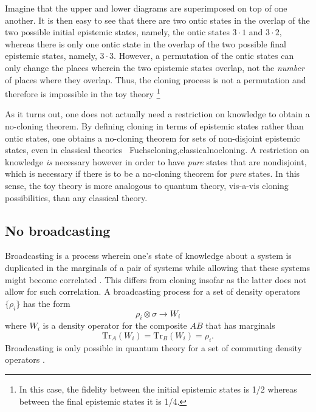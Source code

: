 \documentclass[pra,nofootinbib,showpacs,12pt]{revtex4}
\begin{document}
Imagine that the upper and lower diagrams are superimposed on top of one
another. It is then easy to see that there are two ontic states in the
overlap of the two possible initial epistemic states, namely, the ontic
states $3\cdot 1$ and $3\cdot 2$, whereas there is only one ontic state in
the overlap of the two possible final epistemic states, namely, $3\cdot 3$.
However, a permutation of the ontic states can only change the places
wherein the two epistemic states overlap, not the \emph{number} of places
where they overlap. Thus, the cloning process is not a permutation and
therefore is impossible in the toy theory \footnote{%
In this case, the fidelity between the initial epistemic states is 1/2
whereas between the final epistemic states it is 1/4.}

As it turns out, one does not actually need a restriction on knowledge to
obtain a no-cloning theorem. By defining cloning in terms of epistemic
states rather than ontic states, one obtains a no-cloning theorem for sets
of non-disjoint epistemic states, even in classical theories~{%
Fuchscloning,classicalnocloning}. A restriction on knowledge \emph{is }%
necessary however in order to have \emph{pure} states that are nondisjoint,
which is necessary if there is to be a no-cloning theorem for \emph{pure}
states. In this sense, the toy theory is more analogous to quantum theory,
vis-a-vis cloning possibilities, than any classical theory.

\subsection{No broadcasting}

\label{nobroadcasting}

Broadcasting is a process wherein one's state of knowledge about a system is
duplicated in the marginals of a pair of systems while allowing that these
systems might become correlated \cite{broadcasting}. This differs from
cloning insofar as the latter does not allow for such correlation. A
broadcasting process for a set of density operators $\{\rho _{i}\}$ has the
form
\begin{equation}
\rho _{i}\otimes \sigma \rightarrow W_{i}  \label{defnbroadcasting}
\end{equation}
where $W_{i}$ is a density operator for the composite $AB$ that has
marginals
\begin{equation}
\text{Tr}_{A}(W_{i})=\text{Tr}_{B}(W_{i})=\rho _{i}.
\label{constraintonmarginals}
\end{equation}
Broadcasting is only possible in quantum theory for a set of commuting
density operators \cite{broadcasting}.
\end{document}
